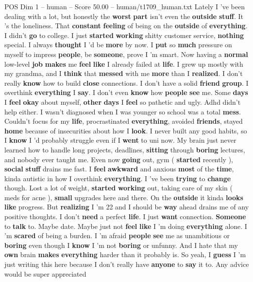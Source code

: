 \begin{textsample}{POS Dim 1 – human – Score 50.00 – human/t1709\_human.txt}  \label{ex:f1_pos_032}
Lately I ’ve been dealing with a lot, but honestly the \textbf{worst} \textbf{part} isn't even the \textbf{outside} \textbf{stuff}.
It ’s the loneliness.
That \textbf{constant} \textbf{feeling} of being on the \textbf{outside} of \textbf{everything}.
I didn't \textbf{go} to college.
I just \textbf{started} \textbf{working} shitty customer service, \textbf{nothing} special.
I always \textbf{thought} I ’d be \textbf{more} by now.
I \textbf{put} so \textbf{much} pressure on myself to impress \textbf{people}, be \textbf{someone}, prove I ’m smart.
Now having a \textbf{normal} low-level \textbf{job} \textbf{makes} me \textbf{feel} \textbf{like} I already failed at \textbf{life}.
I grew up mostly with my grandma, and I \textbf{think} that \textbf{messed} with me \textbf{more} than I \textbf{realized}.
I don't really \textbf{know} how to build \textbf{close} connections.
I don't have a solid \textbf{friend} \textbf{group}.
I overthink \textbf{everything} I \textbf{say}.
I don't even \textbf{know} how \textbf{people} \textbf{see} me.
Some \textbf{days} I \textbf{feel} \textbf{okay} about myself, \textbf{other} \textbf{days} I \textbf{feel} so pathetic and ugly.
Adhd didn't help either.
I wasn't diagnosed when I was younger so school was a total \textbf{mess}.
Couldn't focus for my \textbf{life}, procrastinated \textbf{everything}, avoided \textbf{friends}, stayed \textbf{home} because of insecurities about how I \textbf{look}.
I never built any good habits, so I \textbf{know} I ’d probably struggle even if I \textbf{went} to uni now.
My brain just never learned how to handle long projects, deadlines, \textbf{sitting} through \textbf{boring} lectures, and nobody ever taught me.
Even now \textbf{going} out, gym ( \textbf{started} recently ), \textbf{social} \textbf{stuff} drains me fast.
I \textbf{feel} \textbf{awkward} and anxious \textbf{most} of the \textbf{time}, kinda autistic in how I overthink \textbf{everything}.
I ’ve been \textbf{trying} to \textbf{change} though.
Lost a lot of weight, \textbf{started} \textbf{working} out, taking care of my skin ( meds for acne ), \textbf{small} upgrades here and there.
On the \textbf{outside} it kinda \textbf{looks} \textbf{like} progress.
But \textbf{realizing} I ’m 22 and I should be \textbf{way} ahead drains me of any positive thoughts.
I don't \textbf{need} a perfect \textbf{life}.
I just \textbf{want} connection. \textbf{Someone} to \textbf{talk} to.
Maybe date.
Maybe just not \textbf{feel} \textbf{like} I ’m doing \textbf{everything} alone.
I ’m \textbf{scared} of being a burden.
I ’m afraid \textbf{people} \textbf{see} me as unambitious or \textbf{boring} even though I \textbf{know} I ’m not \textbf{boring} or unfunny.
And I hate that my \textbf{own} brain \textbf{makes} \textbf{everything} harder than it probably is.
So yeah, I \textbf{guess} I ’m just writing this here because I don't really have \textbf{anyone} to \textbf{say} it to.
Any advice would be super appreciated {\EmojiFont 🖤}


\end{textsample}
